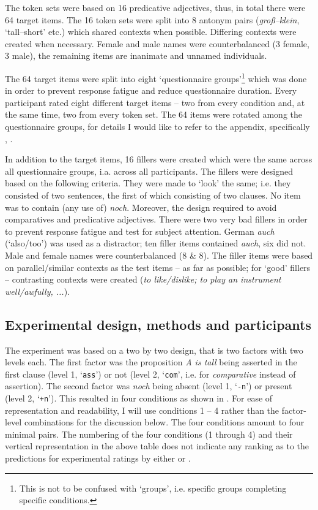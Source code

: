 \documentclass[output=paper,
modfonts
]{langscibook}
\begin{document}
The token sets were based on 16 predicative adjectives, thus, in total there were 64 target items. The 16 token sets were split into 8 antonym pairs (\textit{groß--klein}, `tall--short' etc.) which shared contexts when possible. Differing contexts were created when necessary. Female and male names were counterbalanced (3 female, 3 male), the remaining items are inanimate and unnamed individuals.

The 64 target items were split into eight `questionnaire groups'\footnote{ This is not to be confused with `groups', i.e. specific groups completing specific conditions.} which was done in order to prevent response fatigue and reduce questionnaire duration. Every participant rated eight different target items -- two from every condition and, at the same time, two from every token set. The 64 items were rotated among the questionnaire groups, for details I would like to refer to the appendix, specifically , \pageref{tab:questionnaire_combos}.

In addition to the target items, 16 fillers were created which were the same across all questionnaire groups, i.a. across all participants. The fillers were designed based on the following criteria. They were made to `look' the same; i.e. they consisted of two sentences, the first of which consisting of two clauses. No item was to contain (any use of) \textit{noch}. Moreover, the design required to avoid comparatives and predicative adjectives. There were two very bad fillers in order to prevent response fatigue and test for subject attention. German \textit{auch} (`also/too') was used as a distractor; ten filler items contained \textit{auch}, six did not. Male and female names were counterbalanced (8 \& 8). The filler items were based on parallel/similar contexts as the test items -- as far as possible; for `good' fillers -- contrasting contexts were created (\textit{to like/dislike; to play an instrument well/awfully, ...}).


\subsection{Experimental design, methods and participants}\label{experimental_design_and_methods}

The experiment was based on a two by two design, that is two factors with two levels each. The first factor was the proposition \textit{A is tall} being asserted in the first clause (level 1, `\texttt{ass}') or not (level 2, `\texttt{com}', i.e. for \textit{comparative} instead of assertion). The second factor was \textit{noch} being absent (level 1, `\texttt{-n}') or present (level 2, `\texttt{+n}'). This resulted in four conditions as shown in . For ease of representation and readability, I will use conditions 1 -- 4 rather than the factor-level combinations for the discussion below. The four conditions amount to four minimal pairs. The numbering of the four conditions (1 through 4) and their vertical representation in the above table does not indicate any ranking as to the predictions for experimental ratings by either \citeauthor{umbach2009a_comp} or \citeauthor{Hofstetter2013}. 
\end{document}
